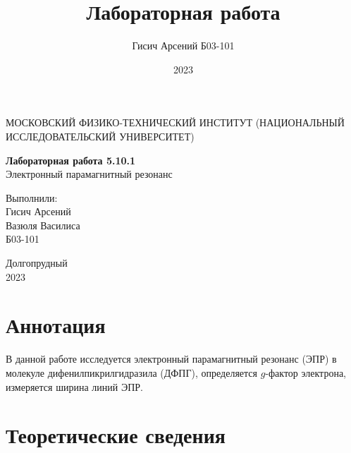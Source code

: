 \documentclass[a4paper, 12pt]{article}
\title{Лабораторная работа}
\author{Гисич Арсений Б03-101}
\date{2023}
\begin{document}
	\begin{center}
		{\large МОСКОВСКИЙ ФИЗИКО-ТЕХНИЧЕСКИЙ ИНСТИТУТ (НАЦИОНАЛЬНЫЙ ИССЛЕДОВАТЕЛЬСКИЙ УНИВЕРСИТЕТ)}
	\end{center}
	\vspace{5 cm}
	{\Large
		\begin{center}
			{\bf Лабораторная работа 5.10.1}\\[0.2 cm]
			Электронный парамагнитный резонанс
		\end{center}
	}
	\vspace{4 cm}
	\begin{flushright}
		{\Large Выполнили: \\
			\vspace{0.2 cm}
			Гисич Арсений \\
            Вазюля Василиса \\ 
			\vspace{0.2 cm}
			Б03-101 \\}
	\end{flushright}
	\vspace{8 cm}
	\begin{center}
		Долгопрудный\\[0.1 cm]
		2023
	\end{center}
\thispagestyle{empty}

\section{Аннотация}

В данной работе исследуется электронный парамагнитный резонанс (ЭПР) в молекуле дифенилпикрилгидразила (ДФПГ), определяется $g$-фактор электрона, измеряется ширина линий ЭПР.

\section{Теоретические сведения}
\end{document}
